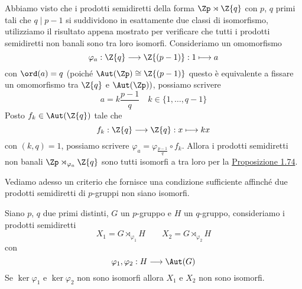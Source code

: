 \documentclass[11pt]{scrartcl}
\begin{document}
	\begin{example}
		Abbiamo visto che i prodotti semidiretti della forma $\Zp \rtimes\Z{q}$
		con $p$, $q$ primi tali che $q \mid p - 1$ si suddividono in esattamente
		due classi di isomorfismo, utilizziamo il risultato appena mostrato 
		per verificare che tutti i prodotti semidiretti non banali sono tra loro 
		isomorfi. Consideriamo un omomorfismo
		\[
		\varphi_a: \Z{q}\longrightarrow \Z{(p - 1)} : 1 \longmapsto a
		\]
		con $\ord(a) = q$ (poiché $\Aut(\Zp) \cong \Z{(p - 1)}$
		questo è equivalente a fissare un omomorfismo tra $\Z{q}$ e $\Aut(\Zp))$,
		possiamo scrivere 
		\[
		a = k\frac{p - 1}{q}\quad k \in \{1, \ldots, q - 1\}
		\]
		Posto $f_k \in \Aut(\Z{q})$ tale che
		\[
		f_k :\Z{q}\longrightarrow\Z{q}: x \longmapsto kx
		\]
		con $(k, q) = 1$, possiamo scrivere 
		$\varphi_a = \varphi_{\frac{p - 1}{q}}\circ f_k$. Allora i prodotti
		semidiretti non banali $\Zp\rtimes_{\varphi_a}\Z{q}$ sono tutti isomorfi
		a tra loro per la \hyperref[prop1.74]{Proposizione 1.74}.
	\end{example}
	
	Vediamo adesso un criterio che fornisce una condizione sufficiente affinché
	due prodotti semidiretti di $p$-gruppi non siano isomorfi.
	
	\begin{proposition}
		Siano $p$, $q$ due primi distinti, $G$ un $p$-gruppo e $H$ un $q$-gruppo,
		consideriamo i prodotti semidiretti 
		\[
		X_1 = G\rtimes_{\varphi_1}H \qquad X_2 = G\rtimes_{\varphi_2}H
		\]
		con 
		\[
		\varphi_1, \varphi_2 :H \longrightarrow \Aut(G)
		\]
		Se $\ker\varphi_1$ e $\ker\varphi_2$ non sono isomorfi allora $X_1$ e 
		$X_2$ non sono isomorfi.
	\end{proposition}
	
\end{document}
